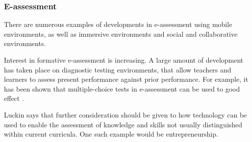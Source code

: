     \subsubsection{E-assessment}
    There are numerous examples of developments in e-assessment using mobile environments, as well as immersive environments and social and collaborative environments.

    Interest in formative e-assessment is increasing. A large amount of development has taken place on diagnostic testing environments, that allow teachers and learners to assess present performance against prior performance. \cite{luckin} For example, it has been shown that multiple-choice tests in e-assessment can be used to good effect \cite{nicol}.


    Luckin says that further consideration should  be given to how technology can be used to enable the assessment of knowledge and skills not usually distinguished within current curricula. \cite{luckin} One such example would be entrepreneurship.

    
